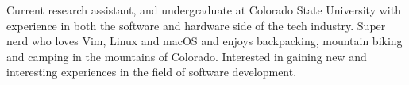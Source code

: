 

\begin{cvparagraph}

Current research assistant, and undergraduate at Colorado State University with experience
in both the software and hardware side of the tech industry.
Super nerd who loves Vim, Linux and macOS and enjoys backpacking, mountain biking and
camping in the mountains of Colorado. Interested in gaining new and interesting experiences
in the field of software development.
\end{cvparagraph}
